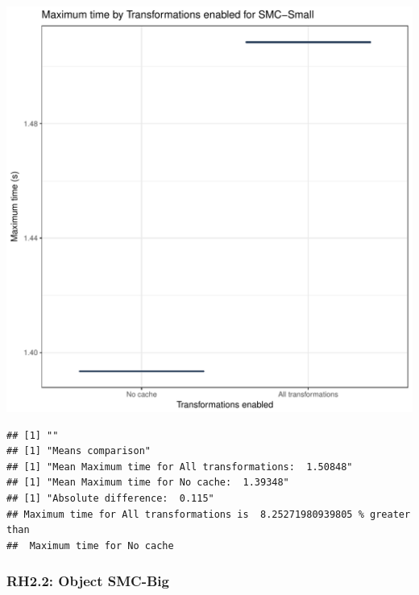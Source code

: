 \documentclass{article}\usepackage[]{graphicx}\usepackage[]{color}
\makeatletter
\def\maxwidth{ %
  \ifdim\Gin@nat@width>\linewidth
    \linewidth
  \else
    \Gin@nat@width
  \fi
}
\newenvironment{kframe}{%
 \def\at@end@of@kframe{}%
 \ifinner\ifhmode%
  \def\at@end@of@kframe{\end{minipage}}%
  \begin{minipage}{\columnwidth}%
 \fi\fi%
 \def\FrameCommand##1{\hskip\@totalleftmargin \hskip-\fboxsep
 \colorbox{shadecolor}{##1}\hskip-\fboxsep
     \hskip-\linewidth \hskip-\@totalleftmargin \hskip\columnwidth}%
 \MakeFramed {\advance\hsize-\width
   \@totalleftmargin\z@ \linewidth\hsize
   \@setminipage}}%
 {\par\unskip\endMakeFramed%
 \at@end@of@kframe}
\newenvironment{knitrout}{}{} %
\makeatother
\begin{document}
\begin{knitrout}
\color{fgcolor}
\includegraphics[width=\maxwidth]{figure/RH2_small-1} 
\begin{kframe}

{\ttfamily\noindent\bfseries\color{errorcolor}{\#\# Error in eval(expr, envir, enclos): object 'shap\_cashew\_small' not found}}\begin{verbatim}
## [1] ""
## [1] "Means comparison"
## [1] "Mean Maximum time for All transformations:  1.50848"
## [1] "Mean Maximum time for No cache:  1.39348"
## [1] "Absolute difference:  0.115"
## Maximum time for All transformations is  8.25271980939805 % greater than 
##  Maximum time for No cache
\end{verbatim}
\end{kframe}
\end{knitrout}


\subsubsection{RH2.2: Object SMC-Big}
\end{document}
